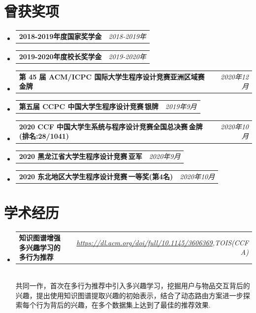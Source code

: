 \documentclass[letterpaper,11pt]{article}
\makeatletter
\newcommand{\resumeItem}[2]{
  \item\small{
    \textbf{#1}{ #2 \vspace{-2pt}}
  }
}
\newcommand{\resumeSubheadingtwo}[2]{
  \vspace{-1pt}\item
    \begin{tabular*}{0.97\textwidth}{l@{\extracolsep{\fill}}r}
      \textbf{#1} & \textit{ #2} \\
    \end{tabular*}\vspace{-5pt}
}
\newcommand{\resumeSubItem}[2]{\resumeItem{#1}{#2}\vspace{-4pt}}
\makeatother
\begin{document}
\section{曾获奖项}
    \begin{itemize}[leftmargin=*,itemsep=-20pt]
        \resumeSubheadingtwo
          {2018-2019年度国家奖学金}{2018-2019年}
        \resumeSubheadingtwo
          {2019-2020年度校长奖学金}{2019-2020年}
        \resumeSubheadingtwo
          {第 45 届 ACM/ICPC 国际大学生程序设计竞赛亚洲区域赛\,金牌}{2020年12月}
        \resumeSubheadingtwo
          {第五届 CCPC 中国大学生程序设计竞赛\,银牌}{2019年9月}
        \resumeSubheadingtwo
          {2020 CCF 中国大学生系统与程序设计竞赛全国总决赛\,金牌 (排名:28/1041)}{2020年10月}
        \resumeSubheadingtwo
          {2020 黑龙江省大学生程序设计竞赛\,亚军}{2020年9月}
        \resumeSubheadingtwo
          {2020 东北地区大学生程序设计竞赛\,一等奖(第4名)}{2020年10月}
    \end{itemize}


\vspace{-10pt}
\section{学术经历}
    \begin{itemize}[leftmargin=*,itemsep=-20pt]
        \resumeSubheadingtwo
            {知识图谱增强多兴趣学习的多行为推荐}{\href{https://dl.acm.org/doi/full/10.1145/3606369}{https://dl.acm.org/doi/full/10.1145/3606369},TOIS(CCF A)}
            \\[5pt]
            共同一作，首次在多行为推荐中引入多兴趣学习，挖掘用户与物品交互背后的兴趣，提出使用知识图谱提取兴趣的初始表示，结合了动态路由方案进一步探索每个行为背后的兴趣，在多个数据集上达到了最佳的推荐效果.
    \end{itemize}
\end{document}

